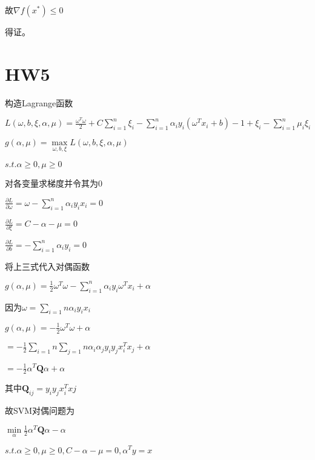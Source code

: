 \documentclass[12pt, a4paper, oneside, fontset=windows]{ctexart}
\begin{document}
故$\nabla f(x^{*}) \leq 0$

得证。
\section{HW5}
构造Lagrange函数

$L(\omega ,b,\xi ,\alpha ,\mu ) = \frac{\omega ^{T}\omega}{2}+C\sum_{i = 1}^{n}\xi_{i} -\sum_{i=1}^{n}\alpha_{i}y_{i}(\omega^{T}x_{i} +b)-1 +\xi_{i} -\sum_{i=1}^{n}\mu_{i}\xi_{i} $

$g(\alpha,\mu) = \mathop{max}\limits_{\omega,b,\xi} L(\omega,b,\xi,\alpha,\mu)$

$s.t.\alpha \geq 0,\mu \geq 0 $

对各变量求梯度并令其为0

$\frac{\partial L}{\partial \omega} = \omega - \sum_{i=1}^{n} \alpha_{i}y_{i}x_{i}=0$

$\frac{\partial L}{\partial \xi} = C-\alpha-\mu=0$

$\frac{\partial L}{\partial b} = -\sum_{i=1}^{n} \alpha_{i}y_{i}=0$

将上三式代入对偶函数

$g(\alpha,\mu) = \frac{1}{2} \omega^{T}\omega - \sum_{i=1}^{n}\alpha_{i}y_{i}\omega^{T}x_{i} + \alpha$

因为$\omega = \sum_{i=1}{n} \alpha_{i}y_{i}x_{i}$

$g(\alpha,\mu) = -\frac{1}{2}\omega^{T}\omega+\alpha$

$=-\frac{1}{2} \sum_{i=1}{n}\sum_{j=1}{n} \alpha_{i}\alpha_{j}y_{i}y_{j}x_{i}^{T}x_{j} + \alpha$

$= -\frac{1}{2}\alpha^{T}\textbf{Q}\alpha + \alpha$

其中$\textbf{Q}_{ij} =y_{i}y_{j}x_{i}^{T}x{j} $

故SVM对偶问题为

$\mathop{min}\limits_{\alpha} \frac{1}{2}\alpha^{T}\textbf{Q}\alpha - \alpha$

$s.t.\alpha \geq 0,\mu \geq 0,C - \alpha - \mu = 0,\alpha^{T}y = x$
\end{document}
